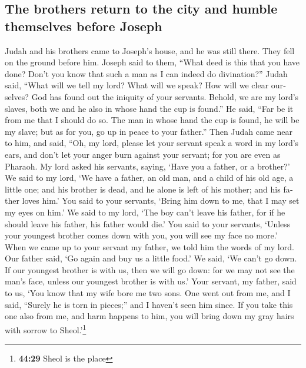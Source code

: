 \begin{paracol}{2}
\begin{otherlanguage}{english}
{\subsection{The brothers return to the city and humble themselves before
Joseph}\label{the-brothers-return-to-the-city-and-humble-themselves-before-joseph}}

 Judah and his brothers came to Joseph's house, and he
was still there. They fell on the ground before him. 
Joseph said to them, ``What deed is this that you have done? Don't you
know that such a man as I can indeed do divination?'' 
Judah said, ``What will we tell my lord? What will we speak? How will we
clear ourselves? God has found out the iniquity of your servants.
Behold, we are my lord's slaves, both we and he also in whose hand the
cup is found.''  He said, ``Far be it from me that I
should do so. The man in whose hand the cup is found, he will be my
slave; but as for you, go up in peace to your father.'' 
Then Judah came near to him, and said, ``Oh, my lord, please let your
servant speak a word in my lord's ears, and don't let your anger burn
against your servant; for you are even as Pharaoh.  My
lord asked his servants, saying, `Have you a father, or a brother?'
 We said to my lord, `We have a father, an old man, and a
child of his old age, a little one; and his brother is dead, and he
alone is left of his mother; and his father loves him.' 
You said to your servants, `Bring him down to me, that I may set my eyes
on him.'  We said to my lord, `The boy can't leave his
father, for if he should leave his father, his father would die.'
 You said to your servants, `Unless your youngest brother
comes down with you, you will see my face no more.'  When
we came up to your servant my father, we told him the words of my lord.
 Our father said, `Go again and buy us a little food.'
 We said, `We can't go down. If our youngest brother is
with us, then we will go down: for we may not see the man's face, unless
our youngest brother is with us.'  Your servant, my
father, said to us, `You know that my wife bore me two sons.
 One went out from me, and I said, ``Surely he is torn in
pieces;'' and I haven't seen him since.  If you take this
one also from me, and harm happens to him, you will bring down my gray
hairs with sorrow to Sheol.'\footnote{\textbf{44:29} Sheol is the place
}
\end{otherlanguage}
\end{paracol}
